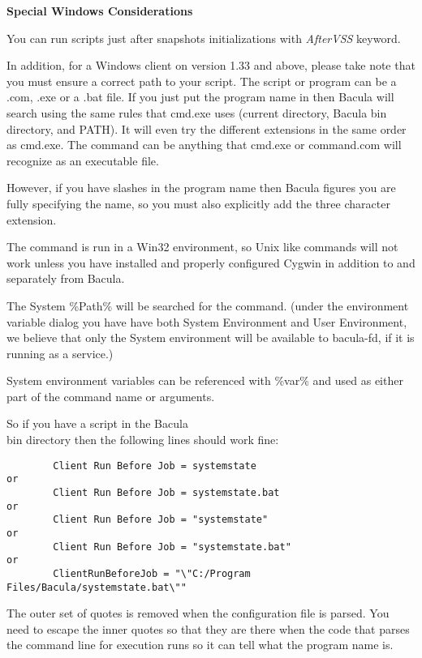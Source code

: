 \begin{description}
   {\bf Special Windows Considerations}

   You can run scripts just after snapshots initializations with
   \textsl{AfterVSS} keyword.

   In addition, for a Windows client on version 1.33 and above, please take
   note that you must ensure a correct path to your script.  The script or
   program can be a .com, .exe or a .bat file.  If you just put the program
   name in then Bacula will search using the same rules that cmd.exe uses
   (current directory, Bacula bin directory, and PATH).  It will even try the
   different extensions in the same order as cmd.exe.
   The command can be anything that cmd.exe or command.com will recognize
   as an executable file.  

   However, if you have slashes in the program name then Bacula figures you
   are fully specifying the name, so you must also explicitly add the three
   character extension.

   The command is run in a Win32 environment, so Unix like commands will not
   work unless you have installed and properly configured Cygwin in addition
   to and separately from Bacula.
   
   The System \%Path\% will be searched for the command.  (under the
   environment variable dialog you have have both System Environment and
   User Environment, we believe that only the System environment will be
   available to bacula-fd, if it is running as a service.)
   
   System environment variables can be referenced with \%var\% and
   used as either part of the command name or arguments.  

   So if you have a script in the Bacula\\bin directory then the following lines
   should work fine:
   
\footnotesize
\begin{verbatim}
        Client Run Before Job = systemstate
or
        Client Run Before Job = systemstate.bat
or
        Client Run Before Job = "systemstate"
or
        Client Run Before Job = "systemstate.bat"
or
        ClientRunBeforeJob = "\"C:/Program Files/Bacula/systemstate.bat\""
\end{verbatim}
\normalsize

The outer set of quotes is removed when the configuration file is parsed.
You need to escape the inner quotes so that they are there when the code
that parses the command line for execution runs so it can tell what the
program name is.



\end{description}
